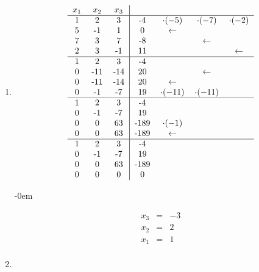 \begin{enumerate}
				\item
											
					\[
						\begin{tabular} {ccc|cccc}
							$x_1$ & $x_2$ & $x_3$ & & &\\
							\hline
							1 & 2 & 3 & -4 & $\cdot(-5)$ & $\cdot(-7)$ & $\cdot(-2)$ \\
							5 & -1 & 1 & 0 & $\leftarrow$ & & \\
							7 & 3 & 7 & -8 & & $\leftarrow$ & \\
							2 & 3 & -1 & 11 & & & $\leftarrow$ \\
							\hline
							1 & 2 & 3 & -4 & & & \\
							0 & -11 & -14 & 20 & & $\leftarrow$ & \\
							0 & -11 & -14 & 20 & $\leftarrow$ & & \\
							0 & -1 & -7 & 19 & $\cdot(-11)$ & $\cdot(-11)$ & \\
							\hline
							1 & 2 & 3 & -4 & & & \\
							0 & -1 & -7 & 19 & & & \\
							0 & 0 & 63 & -189 & $\cdot(-1)$ & & \\
							0 & 0 & 63 & -189 & $\leftarrow$ & & \\
							\hline
							1 & 2 & 3 & -4 & & & \\
							0 & -1 & -7 & 19 & & & \\
							0 & 0 & 63 & -189 & & & \\
							0 & 0 & 0 & 0 & & & \\
						\end{tabular}
					\]
					
					\abovedisplayskip-0em
					
					\[
						\begin{array} {ccc}
							x_3 & = & -3\\
							x_2 & = & 2\\
							x_1 & = & 1\\
						\end{array}
					\]
						\vspace{-0.5}	
				\item
						

\end{enumerate}
